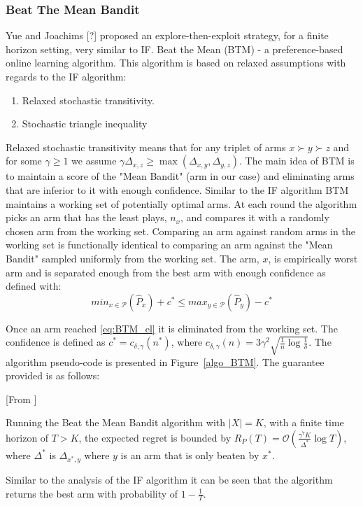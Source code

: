 \documentclass{llncs}
\begin{document}
\subsubsection{Beat The Mean Bandit}
	Yue and Joachims [?] proposed an explore-then-exploit strategy, for a finite horizon setting, very similar to IF. 
	Beat the Mean (BTM) - a preference-based online learning algorithm.
	This algorithm is based on relaxed assumptions with regards to the IF algorithm:
	\begin{enumerate}
		\item Relaxed stochastic transitivity.
		\item Stochastic triangle inequality
	\end{enumerate}
	Relaxed stochastic transitivity means that for any triplet of arms $x \succ y \succ z$ and for some $ \gamma \geq 1 $ we assume $\gamma\Delta_{x,z} \geq  \max(\Delta_{x,y},\Delta_{y,z})$.
	The main idea of BTM is to maintain a score of the "Mean Bandit" (arm in our case) and eliminating arms that are inferior to it with enough confidence.
	Similar to the IF algorithm BTM maintains a working set of potentially optimal arms.
	At each round the algorithm picks an arm that has the least plays, $n_x$, and compares it with a randomly chosen arm from the working set.
	Comparing an arm against random arms in the working set is functionally identical to comparing an arm against the "Mean Bandit" sampled uniformly from the working set.
	The arm, $x$,  is empirically worst arm and is separated enough from the best arm with enough confidence as defined with:
	\begin{equation}\label{eq:BTM_el}
	min_{x\in \mathcal{P}} (\hat{P}_{x})+c^* \leq max_{y \in \mathcal{P}}(\hat{P}_{y})-c^*
\end{equation}	 
	
	Once an arm reached \eqref{eq:BTM_el} it is eliminated from the working set. The confidence is defined as $ c^* = c_{\delta, \gamma}(n^*) $, where $c_{\delta, \gamma}(n) = 3\gamma^2 \sqrt{\frac{1}{n}\log \frac{1}{\delta}}$.
	The algorithm pseudo-code is presented in Figure~\ref{algo_BTM}.	
	The guarantee provided is as follows:
	\begin{theorem}\label{thm:BTM}[From \cite{...}]

		Running the Beat the Mean Bandit algorithm with $|X|=K$, with a finite time horizon of $T>K$, the expected regret is bounded by $R_P(T) = \mathcal{O} \left( \frac{\gamma^7K}{\Delta^*} \log T \right)$, where $\Delta^*$ is $\Delta_{x^*,y}$ where $y$ is an arm that is only beaten by $x^*$.

	\end{theorem}	
	Similar to the analysis of the IF algorithm it can be seen that the algorithm returns the best arm with probability of $1-\frac{1}{T}$.	
	
\end{document}
